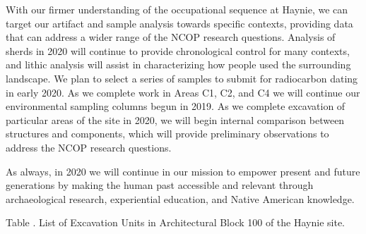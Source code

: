 \documentclass[
  12pt,
]{krantz}
\begin{document}
With our firmer understanding of the occupational sequence at Haynie, we
can target our artifact and sample analysis towards specific contexts,
providing data that can address a wider range of the NCOP research
questions. Analysis of sherds in 2020 will continue to provide
chronological control for many contexts, and lithic analysis will assist
in characterizing how people used the surrounding landscape. We plan to
select a series of samples to submit for radiocarbon dating in early
2020. As we complete work in Areas C1, C2, and C4 we will continue our
environmental sampling columns begun in 2019. As we complete excavation
of particular areas of the site in 2020, we will begin internal
comparison between structures and components, which will provide
preliminary observations to address the NCOP research questions.

As always, in 2020 we will continue in our mission to empower present
and future generations by making the human past accessible and relevant
through archaeological research, experiential education, and Native
American knowledge.

Table . List of Excavation Units in Architectural Block 100 of the Haynie site.
\end{document}
